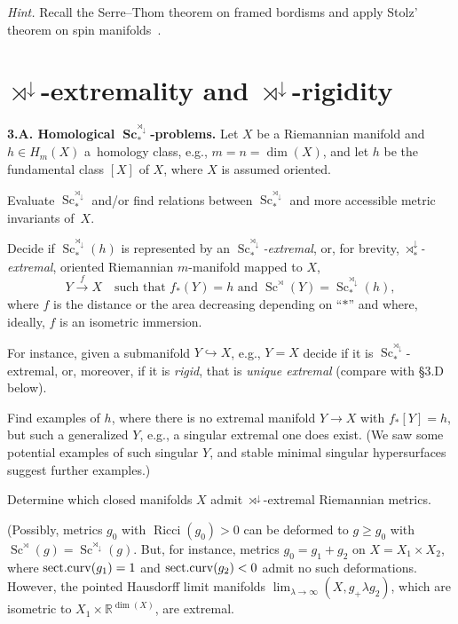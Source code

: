 \documentclass[pdftex]{sigma}
\numberwithin{equation}{section}
\begin{document}
 {\it Hint.} Recall the Serre--Thom theorem on framed bordisms
 and apply Stolz' theorem on spin manifolds~\cite{St1992}.

\section[rtimes\^{}\{downarrow\}-extremality and rtimes\^{}\{downarrow\}-rigidity]{$\boldsymbol{\rtimes^\downarrow}$-extremality and $\boldsymbol{\rtimes^\downarrow}$-rigidity}\label{section3}

\textbf{3.A. Homological $\boldsymbol{\operatorname{Sc}_\ast^{\rtimes_\downarrow}}$-problems.} Let $X$ be a Riemannian manifold and $h\in H_m(X)$ a~homology class,
e.g., $m=n=\dim(X)$, and let $h$ be the fundamental class $[X]$ of $X$, where $X$ is assumed oriented.

Evaluate $\operatorname{Sc}_\ast^{\rtimes_\downarrow}$ and/or
find relations between $\operatorname{Sc}_\ast^{\rtimes_\downarrow}$
 and more accessible metric invariants of~$X$.

Decide if $\operatorname{Sc}_\ast^{\rtimes_\downarrow}(h)$ is represented
by an {\it $\operatorname{Sc}_\ast^{\rtimes_\downarrow}$-extremal}, or, for brevity, {\it $\rtimes^\downarrow_\ast$-extremal},
oriented Riemannian $m$-manifold mapped to $X$,
\[
Y\overset {f} \rightarrow X \quad \text{such that $f_\ast(Y)=h$ and $\operatorname{Sc}^\rtimes (Y)= \operatorname{Sc}_\ast^{\rtimes_\downarrow}(h)$},
\]
where $f$ is the distance or the area decreasing depending on ``$\ast$'' and where, ideally, $f$ is an isometric immersion.

For instance, given a submanifold $Y\hookrightarrow X$, e.g., $Y=X$ decide if it is $\operatorname{Sc}_\ast^{\rtimes_\downarrow}$-extremal,
or, moreover, if it is {\it rigid}, that is {\it unique extremal} (compare with \S3.D below).

Find examples of $h$, where there is no extremal manifold $Y\to X$ with $f_\ast[Y]=h$, but such a generalized $Y$, e.g., a singular extremal one does exist. (We saw some potential examples of such singular $Y$, and stable minimal singular hypersurfaces suggest further examples.)

Determine which closed manifolds $X$ admit
$\rtimes^\downarrow$-extremal Riemannian metrics.

(Possibly, metrics $g_0$ with $\operatorname{Ricci}(g_0) >0$ can be deformed to $g\geq g_0$ with
$\operatorname{Sc}^{\rtimes}(g)= \operatorname{Sc}^{\rtimes_\downarrow}(g)$.
But, for instance, metrics $g_0=g_1+g_2$ on $X = X_1\times X_2 $,
 where ${\rm sect.curv}(g_1)=1$ and ${\rm sect.curv}(g_2)< 0$ admit no such deformations. However, the pointed Hausdorff limit manifolds $\lim_{\lambda\to \infty}(X,g_+\lambda g_2)$, which are isometric to $X_1\times \mathbb R^{\dim(X)}$,
 are extremal.
\end{document}
